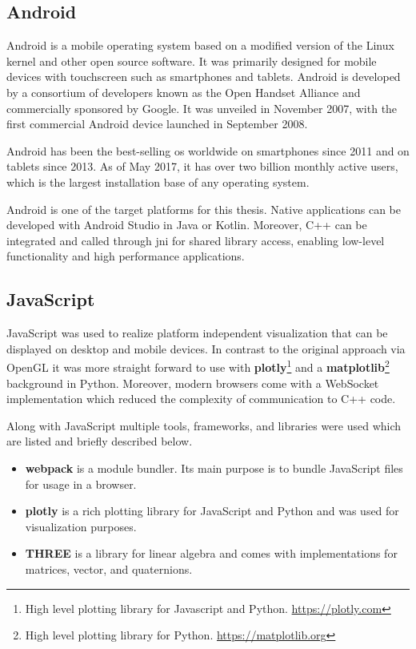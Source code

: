 \subsection{Android}

Android is a mobile operating system based on a modified version of the Linux kernel and other open source software. It was primarily designed for mobile devices with touchscreen such as smartphones and tablets. Android is developed by a consortium of developers known as the Open Handset Alliance and commercially sponsored by Google. It was unveiled in November 2007, with the first commercial Android device launched in September 2008.

Android has been the best-selling \gls{os} worldwide on smartphones since 2011 and on tablets since 2013. As of May 2017, it has over two billion monthly active users, which is the largest installation base of any operating system.

Android is one of the target platforms for this thesis. Native applications can be developed with Android Studio in Java or Kotlin. Moreover, C++ can be integrated and called through \gls{jni} for shared library access, enabling low-level functionality and high performance applications.

\subsection{JavaScript}

JavaScript was used to realize platform independent visualization that can be displayed on desktop and mobile devices. In contrast to the original approach via OpenGL it was more straight forward to use with \textbf{plotly}\footnote{High level plotting library for Javascript and Python. \url{https://plotly.com}} and a \textbf{matplotlib}\footnote{High level plotting library for Python. \url{https://matplotlib.org}} background in Python. Moreover, modern browsers come with a WebSocket implementation which reduced the complexity of communication to C++ code.

Along with JavaScript multiple tools, frameworks, and libraries were used which are listed and briefly described below.

\begin{itemize}
  \item \textbf{webpack} is a module bundler. Its main purpose is to bundle JavaScript files for usage in a browser.
  \item \textbf{plotly} is a rich plotting library for JavaScript and Python and was used for visualization purposes.
  \item \textbf{THREE} is a library for linear algebra and comes with implementations for matrices, vector, and quaternions.
\end{itemize}

